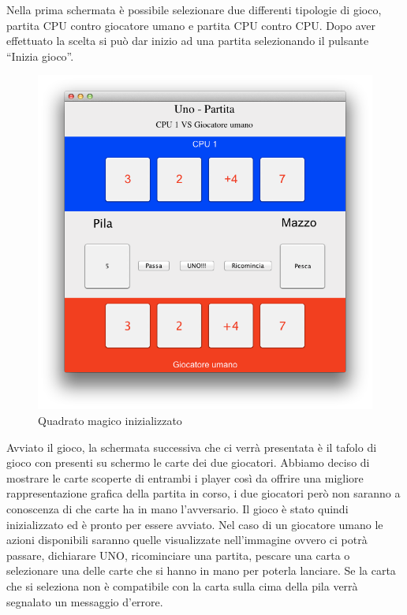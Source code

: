 		Nella prima schermata è possibile selezionare due differenti tipologie di gioco, partita CPU contro giocatore umano e partita CPU contro CPU. Dopo aver effettuato la scelta si può dar inizio ad una partita selezionando il pulsante “Inizia gioco”. 
		
		\begin{figure}[h]
			\centering
			\includegraphics[scale=0.6]{2.png}
			\caption{Quadrato magico inizializzato}
			\label{fig2}
		\end{figure}
		
		Avviato il gioco, la schermata successiva che ci verrà presentata è il tafolo di gioco con presenti su schermo le carte dei due giocatori. Abbiamo deciso di mostrare le carte scoperte di entrambi i player così da offrire una migliore rappresentazione grafica della partita in corso, i due giocatori però non saranno a conoscenza di che carte ha in mano l’avversario. Il gioco è stato quindi inizializzato ed è pronto per essere avviato. Nel caso di un giocatore umano le azioni disponibili saranno quelle visualizzate nell’immagine ovvero ci potrà passare, dichiarare UNO, ricominciare una partita, pescare una carta o selezionare una delle carte che si hanno in mano per poterla lanciare. Se la carta che si seleziona non è compatibile con la carta sulla cima della pila verrà segnalato un messaggio d’errore.
		
